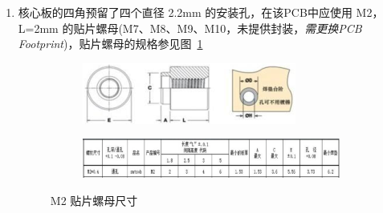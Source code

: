 \begin{enumerate}
  \item 核心板的四角预留了四个直径 2.2mm 的安装孔，在该PCB中应使用 M2， L=2mm 的贴片螺母(M7、M8、M9、M10，未提供封装，\emph{需更换PCB Footprint})，贴片螺母的规格参见图~\ref{fig:M2Size}
  \begin{figure}
    \centering
    \begin{subfigure}[b]{0.35\textwidth}
      \centering
      \includegraphics[width=\textwidth]{./figures/M2_fig.png}
    \end{subfigure}
    \begin{subfigure}[b]{0.7\textwidth}
      \centering
      \includegraphics[width=\textwidth]{./figures/M2_tab.png}
    \end{subfigure}
    \caption{M2 贴片螺母尺寸}
    \label{fig:M2Size}
  \end{figure}


\end{enumerate}
